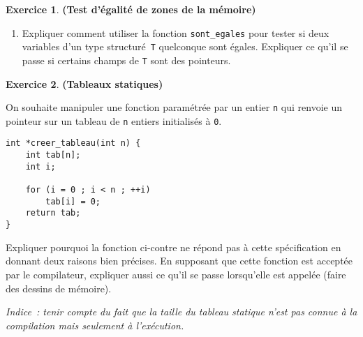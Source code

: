 \documentclass[12pt]{article}
\theoremstyle{definition}
\newtheorem{Exercice}{Exercice}
\begin{document}
\begin{Exercice} {\bf (Test d'égalité de zones de la mémoire)}
\begin{enumerate}
\begin{multicols}{2}
\begin{enumerate}[label = ({\alph*})]
\begin{lstlisting}
a = (1 << 8) + 32;
b = 32;
res = sont_egales(2, &a, &b);
\end{lstlisting}

            \item ~
\begin{lstlisting}
int a;
int b;

a = 0xAE00BBAA
b = 0xEA00BBAA;
res = sont_egales(3, &a, &b);
\end{lstlisting}
        \end{enumerate}
    \end{multicols}
    \smallskip

    \item Expliquer comment utiliser la fonction {\tt sont\_egales}
    pour tester si deux variables d'un type structuré~{\tt T} quelconque
    sont égales. Expliquer ce qu'il se passe si certains champs de {\tt T}
    sont des pointeurs.
\end{enumerate}
\end{Exercice}
\bigskip

\begin{Exercice} {\bf (Tableaux statiques)}\smallskip

On souhaite manipuler une fonction paramétrée par un entier {\tt n} qui
renvoie un pointeur sur un tableau de {\tt n} entiers initialisés à {\tt 0}.

\begin{multicols}{2}
\begin{lstlisting}
int *creer_tableau(int n) {
    int tab[n];
    int i;

    for (i = 0 ; i < n ; ++i)
        tab[i] = 0;
    return tab;
}
\end{lstlisting}

Expliquer pourquoi la fonction ci-contre ne répond pas à cette
spécification en donnant deux raisons bien précises. En supposant que
cette fonction est acceptée par le compilateur, expliquer aussi ce
qu'il se passe lorsqu'elle est appelée (faire des dessins de
mémoire).
\end{multicols}

\noindent
{\it Indice~: tenir compte du fait que la taille du tableau statique
n'est pas connue à la compilation mais seulement à l'exécution.}
\end{Exercice}
\bigskip
\end{document}
